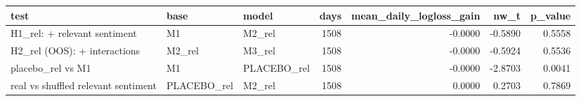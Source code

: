 \begin{tabular}{lllrrrr}
\toprule
test & base & model & days & mean\_daily\_logloss\_gain & nw\_t & p\_value \\
\midrule
H1\_rel: + relevant sentiment & M1 & M2\_rel & 1508 & -0.0000 & -0.5890 & 0.5558 \\
H2\_rel (OOS): + interactions & M2\_rel & M3\_rel & 1508 & -0.0000 & -0.5924 & 0.5536 \\
placebo\_rel vs M1 & M1 & PLACEBO\_rel & 1508 & -0.0000 & -2.8703 & 0.0041 \\
real vs shuffled relevant sentiment & PLACEBO\_rel & M2\_rel & 1508 & 0.0000 & 0.2703 & 0.7869 \\
\bottomrule
\end{tabular}
